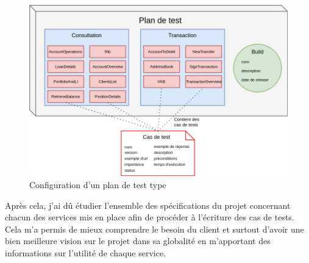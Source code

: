 \begin{figure}[h!]
	\includegraphics[scale=0.5]{images/travailNeuflizeOBC/architecture/testlink.png}
	\centering
	\caption{Configuration d'un plan de test type}
	\label{testlink}
\end{figure}
	
	Après cela, j'ai dû étudier l'ensemble des spécifications du projet concernant chacun des services mis en place afin de procéder à l'écriture des cas de tests. Cela m'a permis de mieux comprendre le besoin du client et surtout d'avoir une bien meilleure vision sur le projet dans sa globalité en m'apportant des informations sur l'utilité de chaque service.
